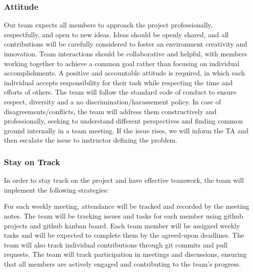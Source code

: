 \documentclass{article}
\begin{document}
\begin{enumerate}
\subsubsection*{Attitude}

Our team expects all members to approach the project professionally, respectfully, and open to new ideas. Ideas should be openly shared, and all contributions
will be carefully considered to foster an environment creativity and innovation. Team interactions should be collaborative and helpful, with members working together to 
achieve a common goal rather than focusing on individual accomplishments. A positive and accountable attitude is required, in which each individual accepts
responsibility for their task while respecting the time and efforts of others. The team will follow the standard code of conduct to ensure respect, diversity and a no discrimination/harassement policy.
In case of disagreements/conflicts, the team will address them constructively and professionally, seeking to understand different perspectives and finding common ground internally in a team meeting.
If the issue rises, we will inform the TA and then escalate the issue to instructor defining the problem.

\subsubsection*{Stay on Track}

In order to stay track on the project and have effective teamwork, the team will implement the following strategies:


\noindent For each weekly meeting, attendance will be tracked and recorded by the meeting notes. The team will be tracking issues and tasks for each member using 
github projects and github kanban board. Each team member will be assigned weekly tasks and will be expected to complete them by the agreed-upon deadlines. 
The team will also track individual contributions through git commits and pull requests. The team will track participation in meetings and discussions, 
ensuring that all members are actively engaged and contributing to the team's progress.


\end{enumerate}
\end{document}

